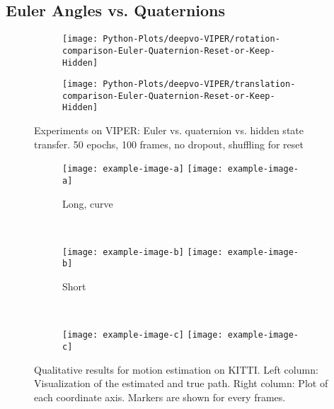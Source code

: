 		\subsection{Euler Angles vs. Quaternions}
		
			\begin{figure}
				\centering
				\begin{subfigure}[b]{0.5\linewidth}
					\centering
					\texttt{[image: Python-Plots/deepvo-VIPER/rotation-comparison-Euler-Quaternion-Reset-or-Keep-Hidden]}
					\caption{}
				\end{subfigure}%
				\begin{subfigure}[b]{0.5\linewidth}
					\centering
					\texttt{[image: Python-Plots/deepvo-VIPER/translation-comparison-Euler-Quaternion-Reset-or-Keep-Hidden]}
					\caption{}
				\end{subfigure}%
				\caption[Experiments on VIPER: Euler vs. quaternion vs. hidden state transfer]
						{Experiments on VIPER: Euler vs. quaternion vs. hidden state transfer.
						 50 epochs, 100 frames, no dropout, shuffling for reset
						 \label{fig:viper-euler-vs-quat-vs-hidden-state-keep-or-reset}}
			\end{figure}
		

		\begin{figure}
			\centering
			\begin{subfigure}[b]{\linewidth}
				\centering
				\texttt{[image: example-image-a]}
				\texttt{[image: example-image-a]}
				\caption{
					Long, curve
					\label{fig:0}
				}
			\end{subfigure}%
			\\
			\begin{subfigure}[b]{\linewidth}
				\centering
				\texttt{[image: example-image-b]}
				\texttt{[image: example-image-b]}
				\caption{
					Short
					\label{fig:0}
				}
			\end{subfigure}%
			\\
			\begin{subfigure}[b]{\linewidth}
				\centering
				\texttt{[image: example-image-c]}
				\texttt{[image: example-image-c]}
				\caption{
					\label{fig:0}
				}
			\end{subfigure}%
			\caption[Qualitative results for motion estimation on KITTI]
					{Qualitative results for motion estimation on KITTI.
				 Left column: Visualization of the estimated and true path.
				 Right column: Plot of each coordinate axis.
				 Markers are shown for every  frames.
					\label{fig:0}}
		\end{figure}


